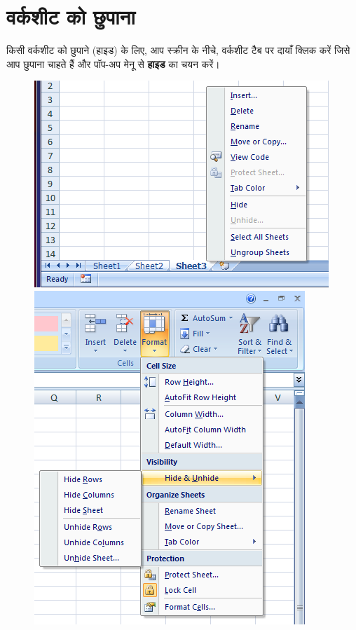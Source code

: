 \section{वर्कशीट को छुपाना}\label{id-1.11}

किसी वर्कशीट को छुपाने (हाइड) के लिए, आप स्क्रीन के नीचे, वर्कशीट टैब पर दायाँ क्लिक करें जिसे आप छुपाना चाहते हैं और पॉप-अप मेनू से \textbf{हाइड} का चयन करें।

\begin{figure}[H]
\centering
\includegraphics[scale=0.4]{src/images/chapter1/chapter1_fig20.png}\qquad
\includegraphics[scale=0.4]{src/images/chapter1/chapter1_fig21.png}
\end{figure}

